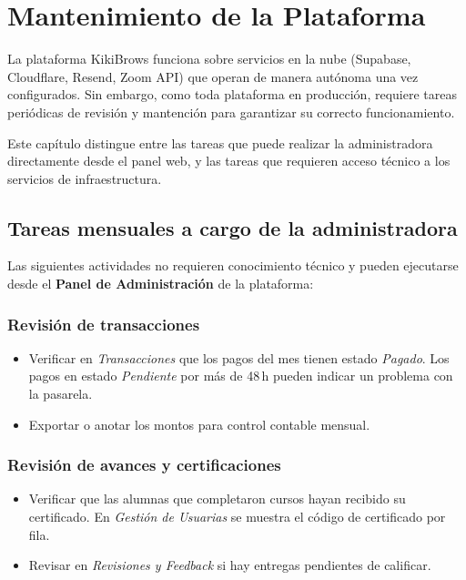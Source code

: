 \documentclass[a4paper,11pt]{article}
\begin{document}
\newpage
\section{Mantenimiento de la Plataforma}

La plataforma KikiBrows funciona sobre servicios en la nube (Supabase, Cloudflare,
Resend, Zoom API) que operan de manera aut\'onoma una vez configurados. Sin embargo,
como toda plataforma en producci\'on, requiere tareas peri\'odicas de revisi\'on y
mantenci\'on para garantizar su correcto funcionamiento.

Este cap\'itulo distingue entre las tareas que puede realizar la administradora
directamente desde el panel web, y las tareas que requieren acceso t\'ecnico a
los servicios de infraestructura.

\subsection{Tareas mensuales a cargo de la administradora}

Las siguientes actividades no requieren conocimiento t\'ecnico y pueden ejecutarse
desde el \textbf{Panel de Administraci\'on} de la plataforma:

\subsubsection*{Revisi\'on de transacciones}
\begin{itemize}
  \item Verificar en \emph{Transacciones} que los pagos del mes tienen estado
        \emph{Pagado}. Los pagos en estado \emph{Pendiente} por m\'as de 48\,h
        pueden indicar un problema con la pasarela.
  \item Exportar o anotar los montos para control contable mensual.
\end{itemize}

\subsubsection*{Revisi\'on de avances y certificaciones}
\begin{itemize}
  \item Verificar que las alumnas que completaron cursos hayan recibido su certificado.
        En \emph{Gesti\'on de Usuarias} se muestra el c\'odigo de certificado por fila.
  \item Revisar en \emph{Revisiones y Feedback} si hay entregas pendientes de calificar.
\end{itemize}
\end{document}
